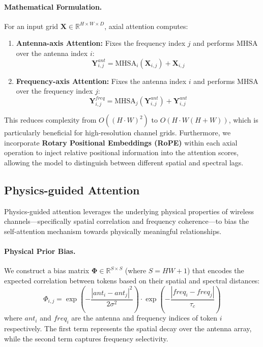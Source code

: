 \documentclass[12pt,a4paper]{article}
\begin{document}
\paragraph{Mathematical Formulation.}
For an input grid $\mathbf{X} \in \mathbb{R}^{H \times W \times D}$, axial attention computes:
\begin{enumerate}
    \item \textbf{Antenna-axis Attention:} Fixes the frequency index $j$ and performs MHSA over the antenna index $i$:
    \begin{equation}
        \mathbf{Y}_{i,j}^{ant} = \text{MHSA}_{i}(\mathbf{X}_{i,j}) + \mathbf{X}_{i,j}
    \end{equation}
    \item \textbf{Frequency-axis Attention:} Fixes the antenna index $i$ and performs MHSA over the frequency index $j$:
    \begin{equation}
        \mathbf{Y}_{i,j}^{freq} = \text{MHSA}_{j}(\mathbf{Y}_{i,j}^{ant}) + \mathbf{Y}_{i,j}^{ant}
    \end{equation}
\end{enumerate}
This reduces complexity from $O((H \cdot W)^2)$ to $O(H \cdot W(H+W))$, which is particularly beneficial for high-resolution channel grids. Furthermore, we incorporate \textbf{Rotary Positional Embeddings (RoPE)} within each axial operation to inject relative positional information into the attention scores, allowing the model to distinguish between different spatial and spectral lags.

\subsection{Physics-guided Attention}\label{subsec:physics}

Physics-guided attention leverages the underlying physical properties of wireless channels—specifically spatial correlation and frequency coherence—to bias the self-attention mechanism towards physically meaningful relationships.

\paragraph{Physical Prior Bias.}
We construct a bias matrix $\mathbf{\Phi} \in \mathbb{R}^{S \times S}$ (where $S = HW+1$) that encodes the expected correlation between tokens based on their spatial and spectral distances:
\begin{equation}
    \Phi_{i,j} = \exp\left(-\frac{|ant_i - ant_j|^2}{2\sigma^2}\right) \cdot \exp\left(-\frac{|freq_i - freq_j|}{\tau_c}\right)
\end{equation}
where $ant_i$ and $freq_i$ are the antenna and frequency indices of token $i$ respectively. The first term represents the spatial decay over the antenna array, while the second term captures frequency selectivity.
\end{document}
